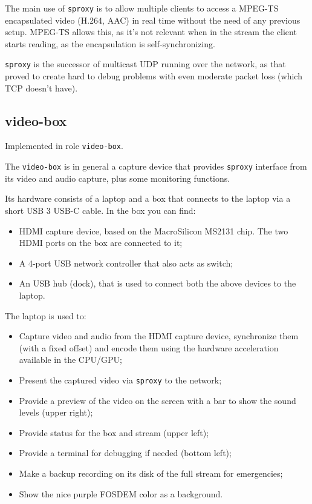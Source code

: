 \documentclass{article}
\begin{document}
The main use of \texttt{sproxy} is to allow multiple clients to access a MPEG-TS encapsulated video (H.264, AAC) in real time without the need of any previous setup. MPEG-TS allows this, as it's not relevant when in the stream the client starts reading, as the encapsulation is self-synchronizing.

\texttt{sproxy} is the successor of multicast UDP running over the network, as that proved to create hard to debug problems with even moderate packet loss (which TCP doesn't have).

\subsection{video-box}

Implemented in role \texttt{video-box}.

The \texttt{video-box} is in general a capture device that provides \texttt{sproxy} interface from its video and audio capture, plus some monitoring functions.

Its hardware consists of a laptop and a box that connects to the laptop via a short USB 3 USB-C cable. In the box you can find:

\begin{itemize}
  \item HDMI capture device, based on the MacroSilicon MS2131 chip. The two HDMI ports on the box are connected to it;
  \item A 4-port USB network controller that also acts as switch;
  \item An USB hub (dock), that is used to connect both the above devices to the laptop.
\end{itemize}

The laptop is used to:

\begin{itemize}
  \item Capture video and audio from the HDMI capture device, synchronize them (with a fixed offset) and encode them using the hardware acceleration available in the CPU/GPU;
  \item Present the captured video via \texttt{sproxy} to the network;
  \item Provide a preview of the video on the screen with a bar to show the sound levels (upper right);
  \item Provide status for the box and stream (upper left);
  \item Provide a terminal for debugging if needed (bottom left);
  \item Make a backup recording on its disk of the full stream for emergencies;
  \item Show the nice purple FOSDEM color as a background.
\end{itemize}
\end{document}
